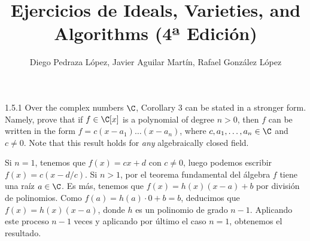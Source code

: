 \documentclass[twoside]{article}
\begin{document}
\title{Ejercicios de Ideals, Varieties, and Algorithms (4ª Edición)}
\author{Diego Pedraza López, Javier Aguilar Martín, Rafael González López}
\maketitle

\begin{ejercicio}{1.5.1}
Over the complex numbers $\C$, Corollary 3 can be stated in a stronger form. Namely, prove that if $f \in \C[x]$ is a polynomial of degree $n > 0$, then $f$ can be written in the form $f = c(x-a_1)\dots(x-a_n)$, where $c,a_1,\dots,a_n \in \C$ and $c \neq 0$. Note that this result  holds for \emph{any} algebraically closed field.
\end{ejercicio}
\begin{solucion}
Si $n = 1$, tenemos que $f(x) = cx+d$ con $c \neq 0$, luego podemos escribir $f(x) = c(x-d/c)$.
Si $n > 1$, por el teorema fundamental del álgebra $f$ tiene una raíz $a \in \C$.
Es más, tenemos que $f(x) = h(x)(x-a)+b$ por división de polinomios.
Como $f(a) = h(a)\cdot 0 + b = b$, deducimos que $f(x) = h(x)(x-a)$, donde $h$ es un polinomio de grado $n-1$.
Aplicando este proceso $n-1$ veces y aplicando por último el caso $n=1$, obtenemos el resultado.
\end{solucion}

\newpage
\end{document}
